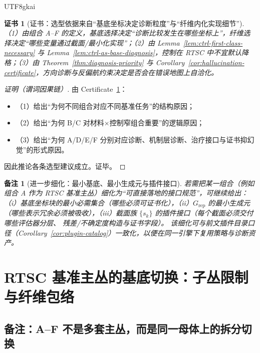 \documentclass[12pt]{article}
\newtheorem{remark}{备注}[section]
\newtheorem{certificate}{证书}[section]
\newcommand{\RTSC}{\textsf{RTSC}}
\begin{document}
\begin{CJK*}{UTF8}{gkai}
\begin{certificate}[证书：选型依据来自“基底坐标决定诊断粒度”与“纤维内化实现细节”]
\label{cert:rtsc-bundle-selection}
（1）由组合 A--F 的定义，基底选择决定“诊断比较发生在哪些坐标上”，纤维选择决定“哪些变量通过截面/最小化实现”；（2）由 Lemma~\ref{lem:ctrl-first-class-necessary} 与
  Lemma~\ref{lem:ctrl-as-base-diagnosis}，控制在 \RTSC{} 中不宜默认降格；（3）由 Theorem~\ref{thm:diagnosis-priority} 与
  Corollary~\ref{cor:hallucination-certificate}，方向诊断与反偏航约束决定是否会在错误地图上自洽化。
\end{certificate}

\begin{proof}[证明（谓词因果链）]
由 Certificate~\ref{cert:rtsc-bundle-selection}：
\begin{itemize}
  \item（1）给出“为何不同组合对应不同基准任务”的结构原因；
  \item（2）给出“为何 B/C 对材料$\times$控制窄组合重要”的逻辑原因；
  \item（3）给出“为何 A/D/E/F 分别对应诊断、机制层诊断、治疗接口与证书抑幻觉”的形式原因。
\end{itemize}
因此推论各条选型建议成立。证毕。
\end{proof}

\begin{remark}[进一步细化：最小基底、最小生成元与插件接口]
若需把某一组合（例如组合 A 作为 \RTSC{} 基准主丛）细化为“可直接落地的接口规范”，可继续给出：
（i）基底坐标块的最小必需集合（哪些必须可证书化），（ii）$G_{\mathrm{rep}}$ 的最小生成元（哪些表示冗余必须被吸收），（iii）截面族 $\{s_k\}$ 的插件接口（每个截面必须交付哪些评估器分层、
  残差/不确定度构造与证书字段）。
该细化可与前文插件目录口径（Corollary~\ref{cor:plugin-catalog}）一致化，以便在同一引擎下复用策略与诊断资产。
\end{remark}

\section{\RTSC{} 基准主丛的基底切换：子丛限制与纤维包络}
\label{sec:rtsc-benchmark-base-switching}

\subsection{备注：A--F 不是多套主丛，而是同一母体上的拆分切换}


\end{CJK*}
\end{document}
